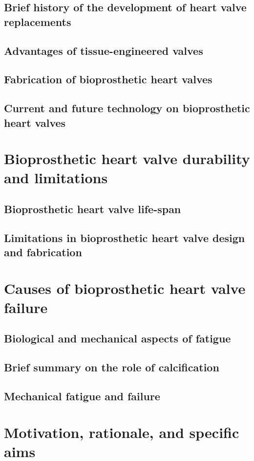 \subsection{Brief history of the development of heart valve replacements}

\subsection{Advantages of tissue-engineered valves}

\subsection{Fabrication of bioprosthetic heart valves}

\subsection{Current and future technology on bioprosthetic heart valves}




\section{Bioprosthetic heart valve durability and limitations}

\subsection{Bioprosthetic heart valve life-span}

\subsection{Limitations in bioprosthetic heart valve design and fabrication}


\section{Causes of bioprosthetic heart valve failure}

\subsection{Biological and mechanical aspects of fatigue}

\subsection{Brief summary on the role of calcification}

\subsection{Mechanical fatigue and failure}

\section{Motivation, rationale, and specific aims}








